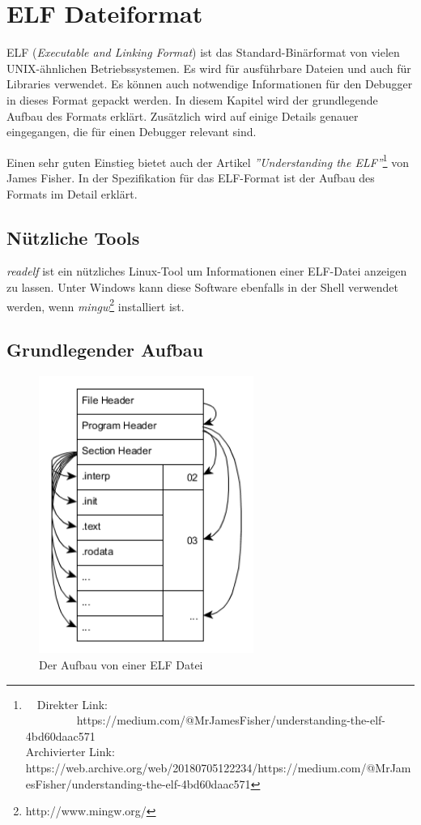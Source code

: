 \chapter{ELF Dateiformat}
ELF (\textit{Executable and Linking Format}) ist das Standard-Binärformat von vielen UNIX-ähnlichen Betriebssystemen.
Es wird für ausführbare Dateien und auch für Libraries verwendet.
Es können auch notwendige Informationen für den Debugger in dieses Format gepackt werden.
In diesem Kapitel wird der grundlegende Aufbau des Formats erklärt.
Zusätzlich wird auf einige Details genauer eingegangen, die für einen Debugger relevant sind.

Einen sehr guten Einstieg bietet auch der Artikel \textit{''Understanding the ELF''}\footnote{\ \ Direkter Link: \ \ \ \ \ \ \ \ \ https://medium.com/@MrJamesFisher/understanding-the-elf-4bd60daac571\\ Archivierter Link: https://web.archive.org/web/20180705122234/https://medium.com/@MrJamesFisher/understanding-the-elf-4bd60daac571} von James Fisher.
In der Spezifikation für das ELF-Format\cite{bib:ELFSpecification} ist der Aufbau des Formats im Detail erklärt.


\section{Nützliche Tools}
\textit{readelf} ist ein nützliches Linux-Tool um Informationen einer ELF-Datei anzeigen zu lassen.
Unter Windows kann diese Software ebenfalls in der Shell verwendet werden, wenn \textit{mingw}\footnote{http://www.mingw.org/} installiert ist.

\section{Grundlegender Aufbau}
\begin{figure}[htbp]
	\centering
		\includegraphics[width=7cm,keepaspectratio]{graphs/elf.png}
	\caption[Der Aufbau von einer ELF Datei]{Der Aufbau von einer ELF Datei\footnotemark}
	\label{fig:ELFStructure}
\end{figure}

